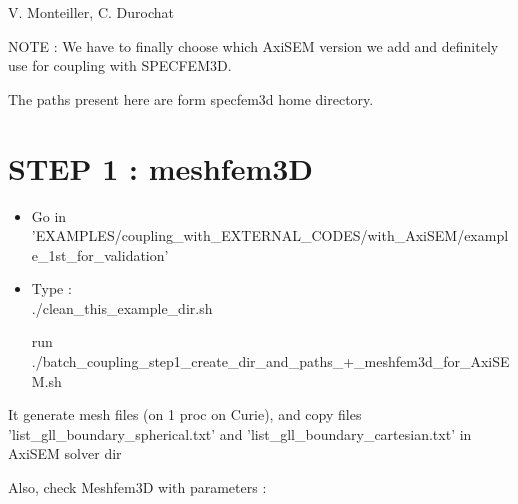 \documentclass[11pt]{article}
\date{}
\begin{document}
{\huge { }}

\bigskip
\bigskip
\bigskip

 V. Monteiller, C. Durochat

\bigskip
\bigskip

\noindent NOTE : We have to finally choose which AxiSEM version we add and definitely use for coupling with SPECFEM3D.

\medskip

\noindent The paths present here are form specfem3d home directory.

\medskip


\bigskip

\section{STEP 1 : meshfem3D}

\begin{itemize}

\item[\textbullet] Go in 'EXAMPLES/coupling\_with\_EXTERNAL\_CODES/with\_AxiSEM/example\_1st\_for\_validation'

\item[\textbullet] Type : \\

\noindent ./clean\_this\_example\_dir.sh

\smallskip

\noindent run ./batch\_coupling\_step1\_create\_dir\_and\_paths\_+\_meshfem3d\_for\_AxiSEM.sh

\end{itemize}

\noindent It generate mesh files (on 1 proc on Curie), and copy files 'list\_gll\_boundary\_spherical.txt' and 'list\_gll\_boundary\_cartesian.txt' in AxiSEM solver dir

\medskip

\noindent Also, check Meshfem3D with parameters : 
\end{document}
